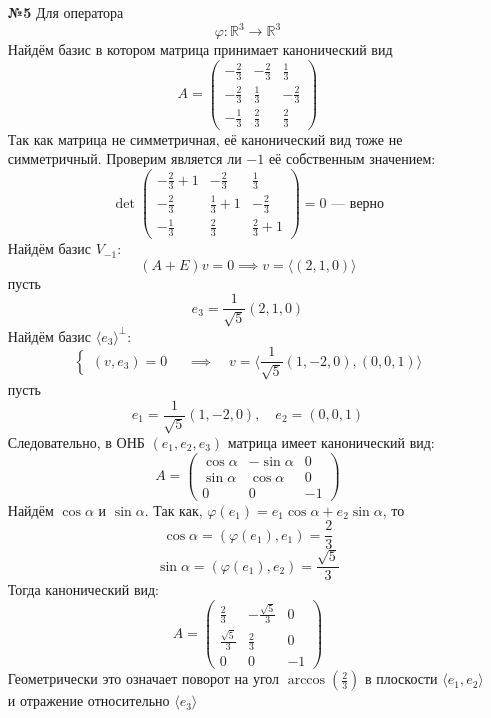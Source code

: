 \documentclass[a4paper]{article}
\renewcommand{\f}[2]{\frac{#1}{#2}}
\newcommand{\case}[1]{\begin{cases} #1 \end{cases}}
\renewcommand{\phi}{\varphi}
\newcommand{\RR}{\mathbb{R}}
\begin{document}
\begin{enumerate}
  \item[\textbf{№5}]Для оператора 
  $$
  \phi: \RR^3 \to \RR^3
  $$
  Найдём базис в котором матрица принимает канонический вид
  $$
  A=\begin{pmatrix}
  -\tfrac23 & -\tfrac23 & \tfrac13\\[3pt]
  -\tfrac23 & \tfrac13 & -\tfrac23\\[3pt]
  -\tfrac13 & \tfrac23 & \tfrac23
  \end{pmatrix}
  $$
  Так как матрица не симметричная, её канонический вид тоже не симметричный.
  Проверим является ли $-1$ её собственным значением:
  $$
   \det\!\begin{pmatrix}
   -\tfrac23+1& -\tfrac23 & \tfrac13\\
   -\tfrac23 & \tfrac13+1 & -\tfrac23\\
   -\tfrac13 & \tfrac23 & \tfrac23+1
   \end{pmatrix}
   =0 \text{ --- верно}
   $$
  Найдём базис $V_{-1}$:
  $$(A+E)v = 0 \implies v = \langle (2, 1, 0)\rangle$$
  пусть $$e_3 = \f{1}{\sqrt{5}}(2, 1, 0)$$
  Найдём базис $\langle e_3 \rangle^\perp$:
  $$\case{
    (v, e_3) = 0
  } \quad \implies \quad v = \langle \frac1{\sqrt5}(1,-2,0), (0,0,1)\rangle$$
  пусть 
  $$e_1 = \frac1{\sqrt5}(1,-2,0), \quad e_2 = (0,0,1)$$
  Следовательно, в ОНБ $(e_1, e_2, e_3)$ матрица имеет канонический вид:
  $$
  A=\begin{pmatrix}
    \cos\alpha & -\sin\alpha & 0\\
    \sin\alpha & \cos\alpha & 0\\
    0 & 0 & -1
  \end{pmatrix}
  $$
  Найдём $\cos \alpha$ и $\sin \alpha$. Так как, $\phi(e_1) = e_1\cos \alpha  + e_2\sin \alpha$, то
  $$\cos \alpha = (\phi(e_1), e_1) = \f{2}{3}$$
  $$\sin \alpha = (\phi(e_1), e_2) = \f{\sqrt{5}}{3}$$
  Тогда канонический вид:
  $$
  A=\begin{pmatrix}
    \f{2}{3} & -\f{\sqrt{5}}{3} & 0\\
    \f{\sqrt{5}}{3} & \f{2}{3} & 0\\
    0 & 0 & -1
  \end{pmatrix}
  $$
  Геометрически это означает поворот на угол $\arccos(\f{2}{3})$ в плоскости $\langle e_1, e_2 \rangle$ и отражение относительно $\langle e_3 \rangle$

\end{enumerate}
\end{document}
